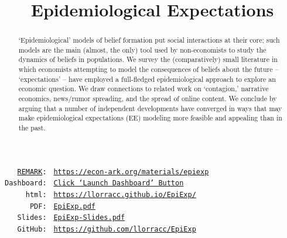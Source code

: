 {    \title{Epidemiological Expectations}
    \renewcommand{\forcedate}{February 5, 2022}
    \maketitle
    \hypertarget{abstract}{}
    \begin{abstract}
      `Epidemiological' models of belief formation put social interactions at their core; such models are the main (almost, the only) tool used by non-economists to study the dynamics of beliefs in populations.  We survey the (comparatively) small literature in which economists attempting to model the consequences of beliefs about the future -- `expectations' -- have employed a full-fledged epidemiological approach to explore an economic question.  We draw connections to related work on `contagion,' narrative economics, news/rumor spreading, and the spread of online content. We conclude by arguing that a number of independent developments have converged in ways that may make epidemiological expectations (EE) modeling more feasible and appealing than in the past.
    \end{abstract}

    \vspace{0.5in}
    \newcommand{\owner}{llorracc}
    \newcommand{\REMARK}{\href{https://github.com/econ-ark/REMARK}{REMARK}}
    \begin{small}
      \parbox{0.9\textwidth}{
        \begin{center}
          \begin{tabbing}
            \texttt{~~~\REMARK:~} \= \= \texttt{\url{https://econ-ark.org/materials/epiexp}} \\ 
            \texttt{Dashboard:~} \> \> \texttt{\href{https://econ-ark.org/materials/epiexp?launch}{Click `Launch Dashboard' Button}} \\
            \texttt{~~~~~html:~} \> \> \texttt{\href{https://\owner.github.io/EpiExp}{https://\owner.github.io/EpiExp/}} \\ %
            \texttt{~~~~~~PDF:~} \> \> \texttt{\href{https://github.com/\owner/EpiExp/blob/master/docs/EpiExp.pdf}{EpiExp.pdf}} \\ 
            \texttt{~~~Slides:~} \> \> \texttt{\href{https://github.com/\owner/EpiExp/blob/master/docs/EpiExp-Slides.pdf}{EpiExp-Slides.pdf}} \\
            \texttt{~~~GitHub:~} \> \> \texttt{\href{https://github.com/\owner/EpiExp}{https://github.com/\owner/EpiExp}} \\
          \end{tabbing}
        \end{center}
      }
    \end{small}

}
